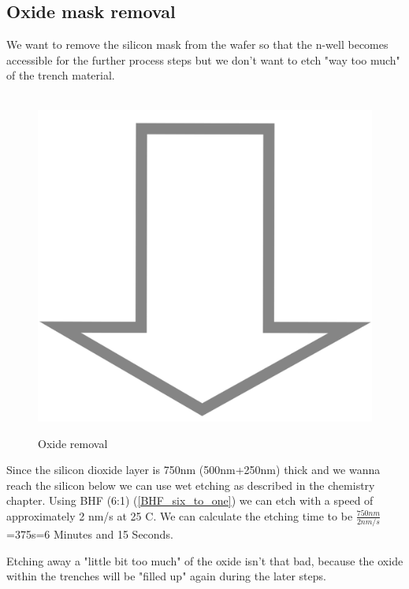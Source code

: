 \subsection{Oxide mask removal}
We want to remove the silicon mask from the wafer so that the n-well becomes accessible for the further process steps but we don't want to etch "way too much" of the trench material.
\begin{figure}[H]
	\centering
	\begin{tikzpicture}[node distance = 3cm, auto, thick,scale=\CrossSectionOnly, every node/.style={transform shape}]
		
	\end{tikzpicture} \\
	\includegraphics[scale=0.01]{down_arrow.png} \\
	\begin{tikzpicture}[node distance = 3cm, auto, thick,scale=\CrossSectionOnly, every node/.style={transform shape}]
		
	\end{tikzpicture}
	\caption{Oxide removal}
\end{figure}
Since the silicon dioxide layer is 750nm (500nm+250nm) thick and we wanna reach the silicon below we can use wet etching as described in the chemistry chapter.
Using BHF (6:1) (\autoref{BHF_six_to_one}) we can etch with a speed of approximately 2 nm/s at 25 \degree C.
We can calculate the etching time to be $\frac{750nm}{2nm/s}$=375s=6 Minutes and 15 Seconds.

Etching away a "little bit too much" of the oxide isn't that bad, because the oxide within the trenches will be "filled up" again during the later steps.
